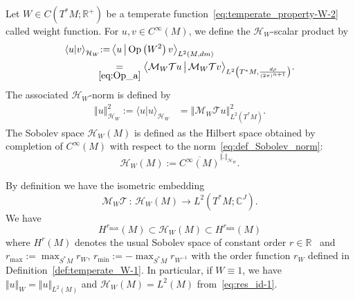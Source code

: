 \documentclass[AHL,Unicode,longabstracts,published]{cedram}
\newcommand{\clT}{\mathcal{T}}
\newcommand{\clH}{\mathcal{H}}
\newcommand{\clM}{\mathcal{M}}
\newcommand{\Opp}{\mathrm{Op}}
\newcommand{\bbR}{\mathbb{R}}
\newcommand{\bbC}{\mathbb{C}}
\newcommand{\clH}{\mathcal{H}}
\newcommand{\bbR}{\mathbb{R}}
\begin{document}
\begin{cBoxA}{}
\begin{defi}[The Sobolev space $\clH _{W}(M)$]\label{def:Anisotropic_Sob_space}
Let $W\in C(T^{*}M;\bbR^{+})$ be a temperate function~\eqref{eq:temperate_property-W-2} called weight function. For $u,v\in C^{\infty}(M)$, we define the $\clH _{W}$-scalar product by
\begin{equation}\label{eq:def_H_W_M}
\begin{split}
\left\langle u|v\right\rangle _{\clH _{W}}
&{:=}\left\langle u\,\middle|\,\Opp \left(W^{2}\right)v\right\rangle _{L^{2}\left(M,dm\right)}\\
&\mkern-8mu\underset{\eqref{eq:Op_a}}{=}\big\langle\clM_{W}\clT u\,\big|\,\clM_{W}\clT v\big\rangle_{L^{2}\left(T^{*}M,\frac{d\rho}{\left(2\pi\right)^{n+1}}\right)}.
\end{split}
\end{equation}
The associated $\clH _{W}$-norm is defined by
\begin{align}\label{eq:def_Sobolev_norm}
\left\Vert u\right\Vert _{\clH _{W}}^{2}:=\langle u|u\rangle_{\clH _{W}} & =\left\Vert \clM_{W}\clT u\right\Vert _{L^{2}\left(T^{*}M\right)}^{2}.
\end{align}
The Sobolev space $\clH _{W}(M)$ is defined as the Hilbert space obtained by completion of $C^{\infty}(M)$ with respect to the norm~\eqref{eq:def_Sobolev_norm}:
\begin{equation}\label{eq:def_H_W}
\clH _{W}\left(M\right):=\overline{C^{\infty}\left(M\right)}^{\left\Vert.\right\Vert _{\clH _{W}}}.
\end{equation}
\end{defi}
\end{cBoxA}

By definition we have the isometric embedding
\begin{equation}\label{eq:isometry}
\clM_{W}\clT\,:\,\clH _{W}\left(M\right)\rightarrow L^{2}\left(T^{*}M;\bbC^{J}\right).
\end{equation}
We have
\[
H^{r_{\max}}\left(M\right)\subset\clH _{W}\left(M\right)\subset H^{r_{\min}}\left(M\right)
\]
where $H^{r}(M)$ denotes the usual Sobolev space of constant order $r\in\bbR$~\cite[Chap.3]{taylor_tome1} and $r_{\max}:=\max_{S^{*}M}r_{W}$, $r_{\min}:=-\max_{S^{*}M}r_{W^{-1}}$ with the order function $r_{W}$ defined in Definition~\ref{def:temperate_W-1}. In particular, if $W\equiv1$, we have $\Vert u\Vert _{W}=\Vert u\Vert _{L^{2}(M)}$ and $\clH _{W}(M)=L^{2}(M)$ from~\eqref{eq:res_id-1}.
\end{document}
